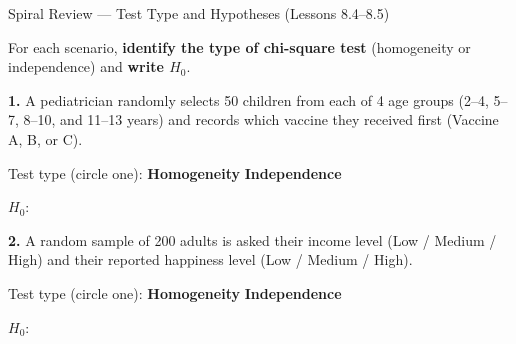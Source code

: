 \documentclass[10pt]{article}
\begin{document}
\namedateperiod

\vspace{0.12in}

\begin{notesbox}{Spiral Review --- Test Type and Hypotheses (Lessons 8.4--8.5)}

For each scenario, \textbf{identify the type of chi-square test} (homogeneity or independence)
and \textbf{write $H_0$}.

\bigskip

\textbf{1.} A pediatrician randomly selects 50 children from each of 4 age groups
(2--4, 5--7, 8--10, and 11--13 years) and records which vaccine they received first
(Vaccine A, B, or C).

\vspace{0.08in}
Test type (circle one): \quad \textbf{Homogeneity} \qquad \textbf{Independence}

\vspace{0.08in}
$H_0$: \writeline

\vspace{0.25in}

\textbf{2.} A random sample of 200 adults is asked their income level
(Low / Medium / High) and their reported happiness level (Low / Medium / High).

\vspace{0.08in}
Test type (circle one): \quad \textbf{Homogeneity} \qquad \textbf{Independence}

\vspace{0.08in}
$H_0$: \writeline

\end{notesbox}
\end{document}

